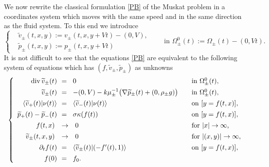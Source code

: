 \documentclass[11pt,reqno]{amsart}
\numberwithin{equation}{section}
\newcommand{\0}{\Omega}
\newcommand{\p}{\partial}
\newcommand{\wt}{\widetilde}
\numberwithin{equation}{section}
\begin{document}
 
 We now rewrite   the classical formulation \eqref{PB} of the Muskat problem   in a coordinates system which moves with the same speed and in the same direction as the fluid system. 
To this end  we introduce
\begin{equation*}
 \left\{
 \begin{aligned}
 & \wt v_\pm (t,x,y):=v_\pm(t,x,y+Vt)-(0,V),\\[1ex]
  &\wt p_\pm (t,x,y):=p_\pm(t,x,y+Vt)
 \end{aligned}
 \right. \qquad\text{in $\0_{\pm}^0(t):=\0_\pm(t)-(0,Vt)$.}
\end{equation*}
It is not difficult to see that the equations \eqref{PB} are equivalent to the following   system of equations which has $(f, \wt v_\pm, \wt p_\pm)$ as unknowns
\begin{equation}\label{EPP}
\left\{
\begin{array}{rlllll}
 {\rm div}\,  \wt v_\pm(t)\!\!&=&\!\! 0 &&\text{in $ \0_{\pm}^0(t),$}\\[1ex]
\wt v_\pm(t)\!\!&=&\!\! -(0,V)-{k}\mu_\pm^{-1}\big(\nabla \wt p_\pm(t)+(0,\rho_\pm g)\big)&&\text{in $ \0_{\pm}^0(t),$} \\[1ex]
\langle \wt v_+(t)| \nu(t)\rangle\!\!&=&\!\! \langle \wt v_-(t)| \nu(t)\rangle&& \text{on $ [y=f(t,x)], $}\\[1ex]
\wt p_+(t)-\wt p_-(t)\!\!&=&\!\! \sigma\kappa(f(t))&&\text{on $ [y=f(t,x)], $}\\[1ex]
f(t,x)&\to &0 &&\text{for  $|x|\to\infty$, }\\[1ex]
\wt v_\pm(t,x,y)&\to& 0 &&\text{for  $|(x,y)|\to\infty,$}\\[1ex]
\p_tf(t) \!\!&=&\!\!\langle \wt v_\pm(t)| (-f'(t),1)\rangle && \text{on   $ [y=f(t,x)], $}\\[1ex]
f(0)\!\!&=&\!\!f_0. 
\end{array}
\right.
\end{equation}
\end{document}
